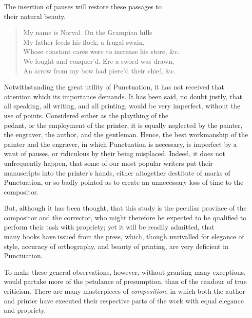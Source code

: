 The insertion of pauses will restore these passages to\\their natural beauty.

\begin{quote}
    \small
    My name is Norval. On the Grampian hills\\
    My father feeds his flock; a frugal swain,\\
    Whose constant cares were to increase his store, \&c.\\
    We fought and conquer'd. Ere a sword was drawn,\\
    An arrow from my bow had pierc'd their chief, \&c.
    \normalsize
\end{quote}

Notwithstanding the great utility of Punctuation, it has not received that
attention which its importance demands. It has been said, no doubt justly, that
all speaking, all writing, and all printing, would be very imperfect, without
the use of points. Considered either as the plaything of the\\pedant, or the
employment of the printer, it is equally neglected by the painter, the engraver,
the author, and the gentleman. Hence, the best workmanship of the painter and
the engraver, in which Punctuation is necessary, is imperfect by a want of
pauses, or ridiculous by their being misplaced. Indeed, it does not unfrequently
happen, that some of our most popular writers put their manuscripts into the
printer's hands, either altogether destitute of marks of\\Punctuation, or so
badly pointed as to create an unnecessary loss of time to the compositor.

But, although it has been thought, that this study is the peculiar province of
the compositor and the corrector, who might therefore be expected to be
qualified to perform their task with propriety; yet it will be readily admitted,
that\\many books have issued from the press, which, though unrivalled for
elegance of style, accuracy of orthography, and beauty of printing, are very
deficient in Punctuation.

To make these general observations, however, without granting many exceptions,
would partake more of the petulance of presumption, than of the candour of true
criticism. There are many masterpieces of \emph{composition}, in which both the
author and printer have executed their respective parts of the work with equal
elegance and propriety.

